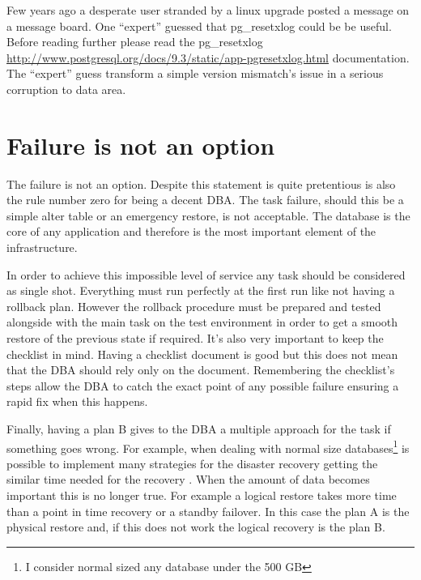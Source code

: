 Few years ago a desperate user stranded by a linux upgrade posted a message on a message 
board. One ``expert'' guessed that pg\_resetxlog could be be useful. Before reading further please read the 
pg\_resetxlog 
\href{http://www.postgresql.org/docs/9.3/static/app-pgresetxlog.html}{
http://www.postgresql.org/docs/9.3/static/app-pgresetxlog.html} documentation. The ``expert'' guess 
transform a simple version mismatch's issue in a serious corruption to data area.

\section{Failure is not an option}
The failure is not an option. Despite this statement is quite pretentious is also the rule number 
zero for being a decent DBA. The task failure, should this be a simple alter table or an emergency 
restore, is not acceptable. The database is the core of any application and therefore is the most important 
element of the infrastructure.\newline

In order to achieve this impossible level of service any task should be considered as single shot. 
Everything must run perfectly at the first run like not having a rollback plan. However the rollback 
procedure must be prepared and tested alongside with the main task on the test environment in order to get a 
smooth restore of the previous state if required. It's also very important to keep the checklist in mind. 
Having a checklist document is good but this does not mean that the DBA should rely only on the 
document. Remembering the checklist's steps allow the DBA to catch the exact point of any possible failure 
ensuring a rapid fix when this happens.\newline

Finally, having a plan B gives to the DBA a multiple approach for the task if something goes wrong. For 
example, when dealing with normal size databases\footnote{I consider normal sized any database under the 500 
GB} is possible to implement many strategies for the disaster recovery getting the similar time needed for 
the recovery . When the amount of data becomes important this is no longer true. For example a logical 
restore takes more time than a point in time recovery or a standby failover. In this case the plan A is the 
physical restore and, if this does not work the logical recovery is the plan B.

